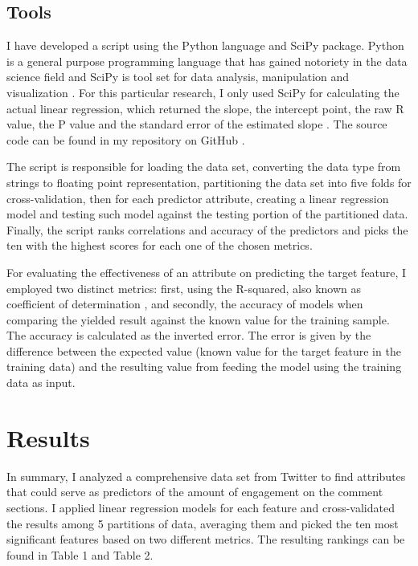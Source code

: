 \documentclass[11pt]{article}
\begin{document}
\subsection {Tools}
\label{tools}
I have developed a script using the Python language and SciPy package. Python is a general purpose programming language \cite{van1995python} \cite{programming} that has gained notoriety in the data science field \cite{kdnuggets} \cite{results} and SciPy is tool set for data analysis, manipulation and visualization \cite{blanco2013learning}. For this particular research, I only used SciPy for calculating the actual linear regression, which returned the slope, the intercept point, the raw R value, the P value and the standard error of the estimated slope \cite{guide}. The source code can be found in my repository on GitHub \cite{thiagorcdlsocial_media_buzz}.

The script is responsible for loading the data set, converting the data type from strings to floating point representation, partitioning the data set into five folds for cross-validation, then for each predictor attribute, creating a linear regression model and testing such model against the testing portion of the partitioned data. Finally, the script ranks correlations and accuracy of the predictors and picks the ten with the highest scores for each one of the chosen metrics.

For evaluating the effectiveness of an attribute on predicting the target feature, I employed two distinct metrics: first, using the R-squared, also known as coefficient of determination \cite{zhang2017coefficient}, and secondly, the accuracy of models when comparing the yielded result against the known value for the training sample. The accuracy is calculated as the inverted error. The error is given by the difference between the expected value (known value for the target feature in the training data) and the resulting value from feeding the model using the training data as input.



\section {Results}
\label{results}
In summary, I analyzed a comprehensive data set from Twitter to find attributes that could serve as predictors of the amount of engagement on the comment sections. I applied linear regression models for each feature and cross-validated the results among 5 partitions of data, averaging them and picked the ten most significant features based on two different metrics. The resulting rankings can be found in Table 1 and Table 2.
\end{document}
